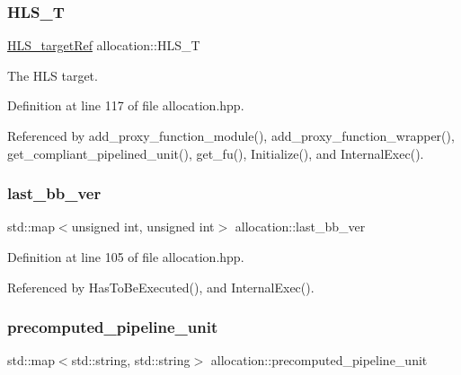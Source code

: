 \subsubsection{\texorpdfstring{H\+L\+S\+\_\+T}{HLS\_T}}
{\footnotesize\ttfamily \hyperlink{hls__target_8hpp_a390f1d55d3b31739665ff2776abe2a3f}{H\+L\+S\+\_\+target\+Ref} allocation\+::\+H\+L\+S\+\_\+T\hspace{0.3cm}{\ttfamily [protected]}}



The H\+LS target. 



Definition at line 117 of file allocation.\+hpp.



Referenced by add\+\_\+proxy\+\_\+function\+\_\+module(), add\+\_\+proxy\+\_\+function\+\_\+wrapper(), get\+\_\+compliant\+\_\+pipelined\+\_\+unit(), get\+\_\+fu(), Initialize(), and Internal\+Exec().

\mbox{\label{classallocation_a9e3e786dd1b209a63a42894a4fb365f1}} 
\subsubsection{\texorpdfstring{last\+\_\+bb\+\_\+ver}{last\_bb\_ver}}
{\footnotesize\ttfamily std\+::map$<$unsigned int, unsigned int$>$ allocation\+::last\+\_\+bb\+\_\+ver\hspace{0.3cm}{\ttfamily [protected]}}



Definition at line 105 of file allocation.\+hpp.



Referenced by Has\+To\+Be\+Executed(), and Internal\+Exec().

\mbox{\label{classallocation_a6da9ffbc83498fadfa6755b0e192d712}} 
\subsubsection{\texorpdfstring{precomputed\+\_\+pipeline\+\_\+unit}{precomputed\_pipeline\_unit}}
{\footnotesize\ttfamily std\+::map$<$std\+::string, std\+::string$>$ allocation\+::precomputed\+\_\+pipeline\+\_\+unit\hspace{0.3cm}{\ttfamily [protected]}}



